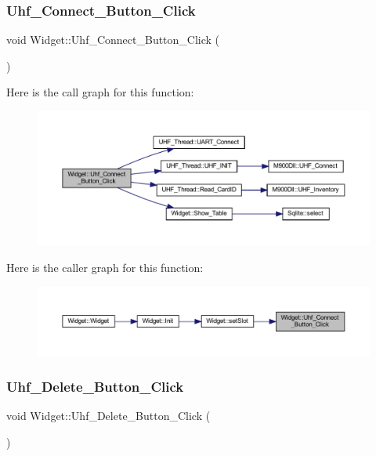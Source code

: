 \subsubsection{\texorpdfstring{Uhf\_Connect\_Button\_Click}{Uhf\_Connect\_Button\_Click}}
{\footnotesize\ttfamily void Widget\+::\+Uhf\+\_\+\+Connect\+\_\+\+Button\+\_\+\+Click (\begin{DoxyParamCaption}{ }\end{DoxyParamCaption})\hspace{0.3cm}{\ttfamily [slot]}}

Here is the call graph for this function\+:
\nopagebreak
\begin{figure}[H]
\begin{center}
\leavevmode
\includegraphics[width=350pt]{class_widget_acceb5443a97ee9023250cda33f183bef_cgraph}
\end{center}
\end{figure}
Here is the caller graph for this function\+:
\nopagebreak
\begin{figure}[H]
\begin{center}
\leavevmode
\includegraphics[width=350pt]{class_widget_acceb5443a97ee9023250cda33f183bef_icgraph}
\end{center}
\end{figure}
\mbox{\label{class_widget_a6ef0cb76aab26c216bdd0584d32bdd1d}} 
\subsubsection{\texorpdfstring{Uhf\_Delete\_Button\_Click}{Uhf\_Delete\_Button\_Click}}
{\footnotesize\ttfamily void Widget\+::\+Uhf\+\_\+\+Delete\+\_\+\+Button\+\_\+\+Click (\begin{DoxyParamCaption}{ }\end{DoxyParamCaption})\hspace{0.3cm}{\ttfamily [slot]}}

